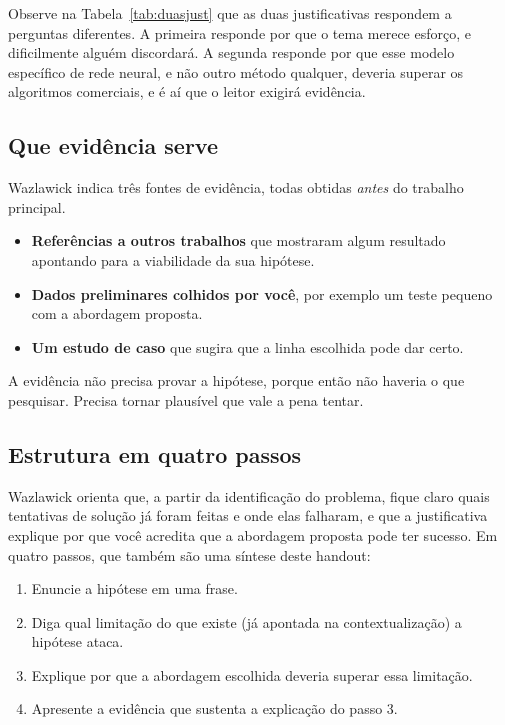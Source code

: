 \documentclass[10pt,a4paper]{extarticle}
\theoremstyle{definition}
\begin{document}
Observe na Tabela~\ref{tab:duasjust} que as duas justificativas respondem a perguntas diferentes. A primeira responde por que o tema merece esforço, e dificilmente alguém discordará. A segunda responde por que esse modelo específico de rede neural, e não outro método qualquer, deveria superar os algoritmos comerciais, e é aí que o leitor exigirá evidência.

\subsection{Que evidência serve}

Wazlawick indica três fontes de evidência, todas obtidas \emph{antes} do trabalho principal.
\begin{itemize}
  \item \textbf{Referências a outros trabalhos} que mostraram algum resultado apontando para a viabilidade da sua hipótese.
  \item \textbf{Dados preliminares colhidos por você}, por exemplo um teste pequeno com a abordagem proposta.
  \item \textbf{Um estudo de caso} que sugira que a linha escolhida pode dar certo.
\end{itemize}
A evidência não precisa provar a hipótese, porque então não haveria o que pesquisar. Precisa tornar plausível que vale a pena tentar.

\subsection{Estrutura em quatro passos}

Wazlawick orienta que, a partir da identificação do problema, fique claro quais tentativas de solução já foram feitas e onde elas falharam, e que a justificativa explique por que você acredita que a abordagem proposta pode ter sucesso. Em quatro passos, que também são uma síntese deste handout:
\begin{enumerate}[label=\textbf{\arabic*.}]
  \item Enuncie a hipótese em uma frase.
  \item Diga qual limitação do que existe (já apontada na contextualização) a hipótese ataca.
  \item Explique por que a abordagem escolhida deveria superar essa limitação.
  \item Apresente a evidência que sustenta a explicação do passo 3.
\end{enumerate}
\end{document}
